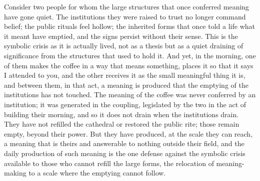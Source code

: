 \begin{casebox}
Consider two people for whom the large structures that once conferred meaning have gone quiet. The institutions they were raised to trust no longer command belief; the public rituals feel hollow; the inherited forms that once told a life what it meant have emptied, and the signs persist without their sense. This is the symbolic crisis as it is actually lived, not as a thesis but as a quiet draining of significance from the structures that used to hold it. And yet, in the morning, one of them makes the coffee in a way that means something, places it so that it says I attended to you, and the other receives it as the small meaningful thing it is, and between them, in that act, a meaning is produced that the emptying of the institutions has not touched. The meaning of the coffee was never conferred by an institution; it was generated in the coupling, legislated by the two in the act of building their morning, and so it does not drain when the institutions drain. They have not refilled the cathedral or restored the public rite; those remain empty, beyond their power. But they have produced, at the scale they can reach, a meaning that is theirs and answerable to nothing outside their field, and the daily production of such meaning is the one defense against the symbolic crisis available to those who cannot refill the large forms, the relocation of meaning-making to a scale where the emptying cannot follow.
\end{casebox}

